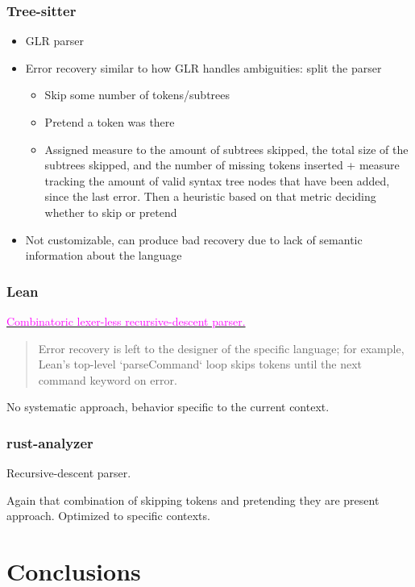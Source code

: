 \documentclass[compress,12pt,xcolor={dvipsnames}]{beamer}
\let\oldhref\href
\renewcommand{\href}[2]{\oldhref{#1}{\textcolor{magenta}{#2}}}
\begin{document}
\begin{frame}
	\frametitle{Tree-sitter}
	\begin{itemize}
		\item GLR parser
		\item Error recovery similar to how GLR handles ambiguities: split the parser
		      \begin{itemize}
			      \item Skip some number of tokens/subtrees
			      \item Pretend a token was there
			      \item Assigned measure to the amount of subtrees skipped, the total size of the subtrees skipped, and the number of missing tokens inserted + measure tracking the amount of valid syntax tree nodes that have been added, since the last error. Then a heuristic based on that metric deciding whether to skip or pretend
		      \end{itemize}
		\item Not customizable, can produce bad recovery due to lack of semantic information about the language
	\end{itemize}
\end{frame}

\begin{frame}
	\frametitle{Lean}
	\href{https://github.com/leanprover/lean4/blob/26a1b934c226c6aa923248804ba92c23f56c5115/src/Lean/Parser/Basic.lean\#L10}{Combinatoric lexer-less recursive-descent parser.}

	\vspace{1em}

	\begin{quote}
		Error recovery is left to the designer of the specific language; for example, Lean's top-level `parseCommand` loop skips tokens until the next command keyword on error.
	\end{quote}

	No systematic approach, behavior specific to the current context.
\end{frame}

\begin{frame}
	\frametitle{rust-analyzer}
	Recursive-descent parser.

	Again that combination of skipping tokens and pretending they are present approach. Optimized to specific contexts.
\end{frame}


\section{Conclusions}
\end{document}
